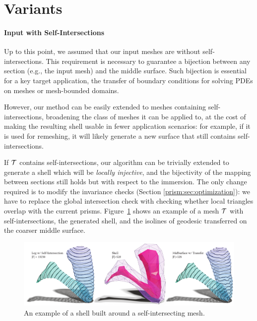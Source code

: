 


\section{Variants}\label{prism:sec:variants}


\paragraph{Input with Self-Intersections}
Up to this point, we assumed that our input meshes are without self-intersections. This requirement is necessary to guarantee a bijection between any section (e.g., the input mesh) and the middle surface. Such bijection is essential for a key target application, the transfer of boundary conditions for solving PDEs on meshes or mesh-bounded domains. 

However, our method can be easily extended to meshes containing self-intersections, broadening the class of meshes it can be applied to, at the cost of making the resulting shell usable in fewer application scenarios: for example, if it is used for remeshing, it will likely generate a new surface that still contains self-intersections.

If $\mathcal{T}$ contains self-intersections, our algorithm can be trivially extended to generate a shell which will be \emph{locally injective}, and the bijectivity of the mapping between sections still holds but with respect to the immersion. The only change required is to modify the invariance checks (Section \ref{prism:sec:optimization}): we have to replace the global intersection check with checking whether local triangles overlap with the current prisms. Figure~\ref{prism:fig:intersect-leg} shows an example of a mesh $\mathcal{T}$ with self-intersections, the generated shell, and the isolines of geodesic transferred on the coarser middle surface.
\begin{figure}
    \centering
    \includegraphics[width=\linewidth]{prism-tex/figs/leg-intersect}
    \caption{An example of a shell built around a self-intersecting mesh.}
    \label{prism:fig:intersect-leg}
    
\end{figure}


